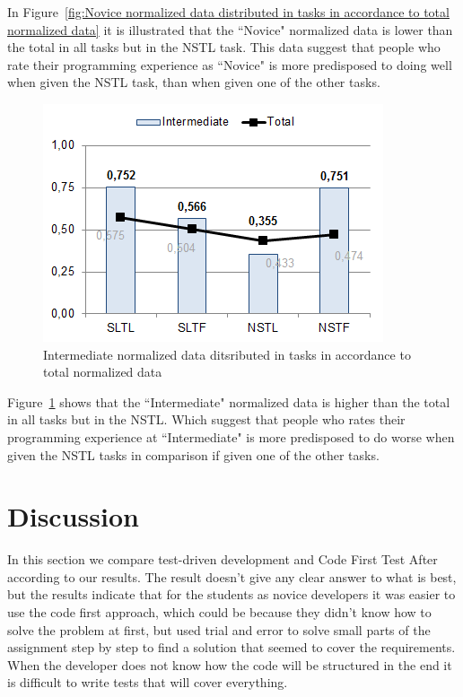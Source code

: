 \documentclass{sig-alternate-05-2015}
\begin{document}
In Figure~\ref{fig:Novice normalized data distributed in tasks in accordance to total normalized data} it is illustrated that the ``Novice" normalized data is lower than the total in all tasks but in the NSTL task. This data suggest that people who rate their programming experience as ``Novice" is more predisposed to doing well when given the NSTL task, than when given one of the other tasks.

\begin{figure}[!ht]
	\centering
	\includegraphics[width=1\linewidth]{img12}
	\caption{Intermediate normalized data ditsributed in tasks in accordance to total normalized data}
	\label{fig:Intermediate normalized data ditsributed in tasks in accordance to total normalized data}
\end{figure}

Figure~\ref{fig:Intermediate normalized data ditsributed in tasks in accordance to total normalized data} shows that the ``Intermediate" normalized data is higher than the total in all tasks but in the NSTL. Which suggest that people who rates their programming experience at ``Intermediate" is more predisposed to do worse when given the NSTL tasks in comparison if given one of the other tasks.


\section{Discussion}
\label{sec:Discussion}
In this section we compare test-driven development and Code First Test After according to our results. The result doesn't give any clear answer to what is best, but the results indicate that for the students as novice developers it was easier to use the code first approach, which could be because they didn't know how to solve the problem at first, but used trial and error to solve small parts of the assignment step by step to find a solution that seemed to cover the requirements. When the developer does not know how the code will be structured in the end it is difficult to write tests that will cover everything.
\end{document}
